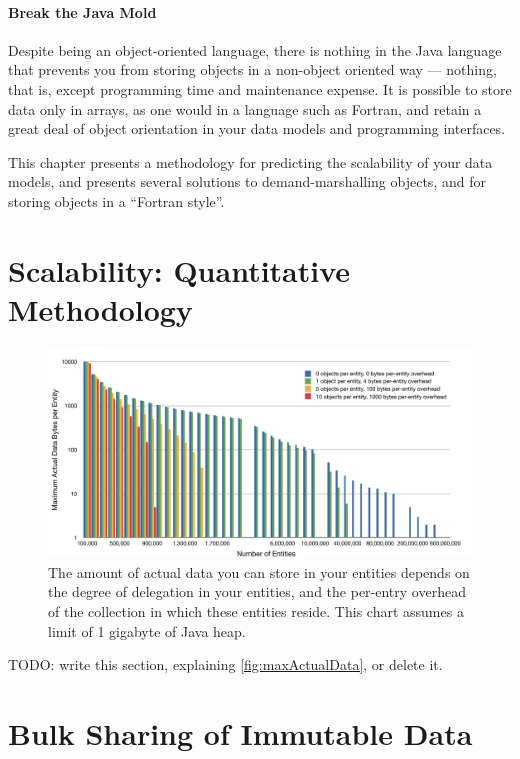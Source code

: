 \paragraph{Break the Java Mold} Despite being an object-oriented language, there
is nothing in the Java language that prevents you from storing objects in a
non-object oriented way --- nothing, that is, except programming time and
maintenance expense. It is possible to store data only in arrays, as one would in
a language such as Fortran, and retain a great deal of object orientation in your
data models and programming interfaces. 

This chapter presents a methodology for predicting the scalability of your data
models, and presents several solutions to demand-marshalling objects, and for
storing objects in a ``Fortran style''.

\section{Scalability: Quantitative Methodology}

\begin{figure}
\centering
	\includegraphics[width=\textwidth]{part4/Figures/maxActualData}
	\caption{The amount of actual data you can store in your entities depends on
	the degree of delegation in your entities, and the per-entry overhead of the collection in which these entities
	reside. This chart assumes a limit of 1 gigabyte of Java heap.}
	\label{fig:maxActualData}
\end{figure}

TODO: write this section, explaining \autoref{fig:maxActualData}, or delete it.

\section{Bulk Sharing of Immutable Data}
\label{sec:bulk-sharing-pool}

